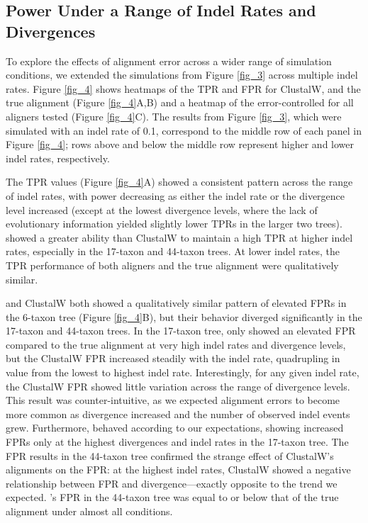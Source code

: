 \documentclass{mbe}
\begin{document}
\subsection*{\Sw Power Under a Range of Indel Rates and Divergences}

To explore the effects of alignment error across a wider range of
simulation conditions, we extended the simulations from Figure
\ref{fig_3} across multiple indel rates. Figure \ref{fig_4} shows
heatmaps of the TPR and FPR for ClustalW, \prankc and the true
alignment (Figure \ref{fig_4}A,B) and a heatmap of the
error-controlled \tpr for all aligners tested (Figure
\ref{fig_4}C). The results from Figure \ref{fig_3}, which were
simulated with an indel rate of 0.1, correspond to the middle row of
each panel in Figure \ref{fig_4}; rows above and below the middle row
represent higher and lower indel rates, respectively.

The TPR values (Figure \ref{fig_4}A) showed a consistent pattern
across the range of indel rates, with power decreasing as either the
indel rate or the divergence level increased (except at the lowest
divergence levels, where the lack of evolutionary information yielded
slightly lower TPRs in the larger two trees). \prankc{} showed a
greater ability than ClustalW to maintain a high TPR at higher indel
rates, especially in the 17-taxon and 44-taxon trees. At lower indel
rates, the TPR performance of both aligners and the true alignment
were qualitatively similar.

\prankc{} and ClustalW both showed a qualitatively similar pattern of
elevated FPRs in the 6-taxon tree (Figure \ref{fig_4}B), but their
behavior diverged significantly in the 17-taxon and 44-taxon trees. In
the 17-taxon tree, \prankc{} only showed an elevated FPR compared to
the true alignment at very high indel rates and divergence levels, but
the ClustalW FPR increased steadily with the indel rate, quadrupling
in value from the lowest to highest indel rate. Interestingly, for any
given indel rate, the ClustalW FPR showed little variation across the
range of divergence levels. This result was counter-intuitive, as we
expected alignment errors to become more common as divergence
increased and the number of observed indel events grew. Furthermore,
\prankc{} behaved according to our expectations, showing increased
FPRs only at the highest divergences and indel rates in the 17-taxon
tree. The FPR results in the 44-taxon tree confirmed the strange
effect of ClustalW’s alignments on the \sw FPR: at the highest indel
rates, ClustalW showed a negative relationship between FPR and
divergence---exactly opposite to the trend we expected. \prankc{}'s
FPR in the 44-taxon tree was equal to or below that of the true
alignment under almost all conditions.
\end{document}
